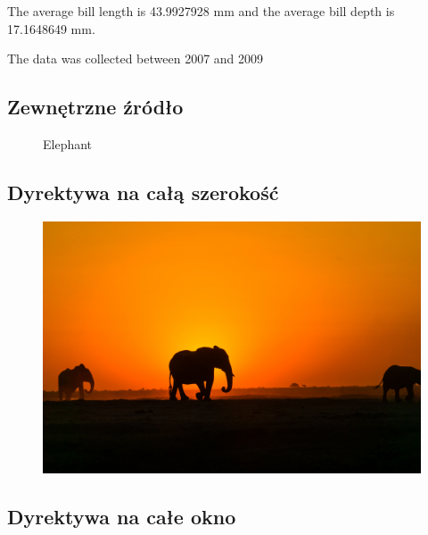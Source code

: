\documentclass[
  a4paper,
  DIV=11,
  numbers=noendperiod,
  oneside,
  open=any]{scrreprt}
\begin{document}
The average bill length is 43.9927928 mm and the average bill depth is
17.1648649 mm.

The data was collected between 2007 and 2009

\subsection{Zewnętrzne źródło}\label{zewnux119trzne-ux17aruxf3dux142o}

\begin{figure}

\centering{

}

\caption{\label{fig-elephant}Elephant}

\end{figure}%

\subsection{Dyrektywa na całą
szerokość}\label{dyrektywa-na-caux142ux105-szerokoux15bux107}

\begin{figure}

\includegraphics{elephant.jpg}

\end{figure}%

\subsection{Dyrektywa na całe okno}\label{dyrektywa-na-caux142e-okno}
\end{document}
